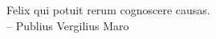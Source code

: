 
\thispagestyle{empty}
{}

\vspace*{3cm}

\begin{center}
    Felix qui potuit rerum cognoscere causas.\\
	\flushright -- Publius Vergilius Maro
\end{center}